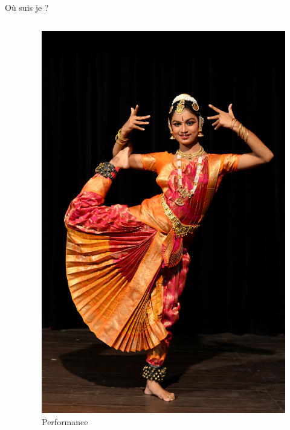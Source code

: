 \documentclass{beamer}
\begin{document}
\begin{frame}{Où suis je ?}
\begin{columns}
\begin{column}{0.6\textwidth}
\begin{block}{}
\end{block}
\end{column}
\begin{column}{0.4\textwidth}
\begin{block}{}
\begin{figure}
    \centering
    \includegraphics[width=\textwidth]{Bharata_Natyam_Performance_DS.jpg}
    \caption{Performance}
    \label{fig:perfo}
\end{figure}
\end{block}
\end{column}
\end{columns}
\end{frame}
\end{document}
